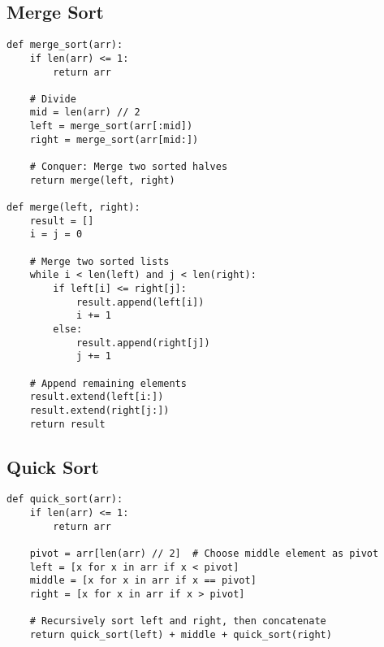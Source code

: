 \subsection{Merge Sort}
\begin{algo}
\begin{lstlisting}
def merge_sort(arr):
    if len(arr) <= 1:
        return arr

    # Divide
    mid = len(arr) // 2
    left = merge_sort(arr[:mid])
    right = merge_sort(arr[mid:])

    # Conquer: Merge two sorted halves
    return merge(left, right)

def merge(left, right):
    result = []
    i = j = 0

    # Merge two sorted lists
    while i < len(left) and j < len(right):
        if left[i] <= right[j]:
            result.append(left[i])
            i += 1
        else:
            result.append(right[j])
            j += 1

    # Append remaining elements
    result.extend(left[i:])
    result.extend(right[j:])
    return result
\end{lstlisting}
\end{algo}

\subsection{Quick Sort}
\begin{algo}
\begin{lstlisting}
def quick_sort(arr):
    if len(arr) <= 1:
        return arr

    pivot = arr[len(arr) // 2]  # Choose middle element as pivot
    left = [x for x in arr if x < pivot]
    middle = [x for x in arr if x == pivot]
    right = [x for x in arr if x > pivot]

    # Recursively sort left and right, then concatenate
    return quick_sort(left) + middle + quick_sort(right)
\end{lstlisting}
\end{algo}
